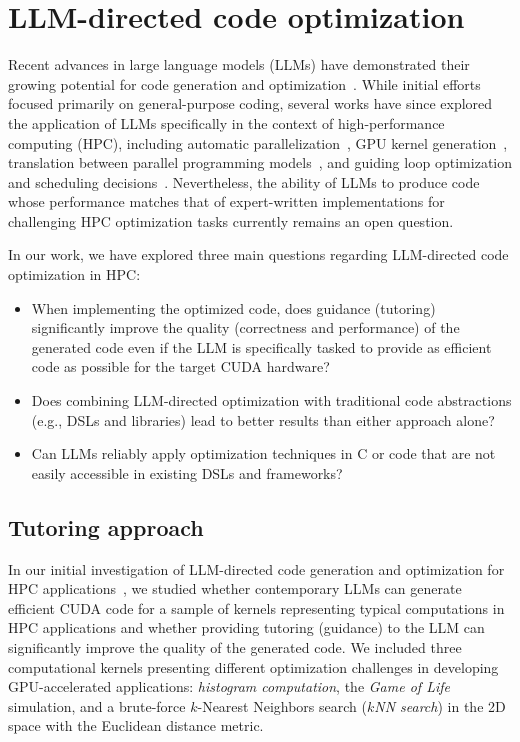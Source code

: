 \chapter{LLM-directed code optimization}\label{chap:llm-directed-code-optimization}

Recent advances in large language models (LLMs) have demonstrated their growing potential for code generation and optimization~\cite{chen2021evaluating}. While initial efforts focused primarily on general-purpose coding, several works have since explored the application of LLMs specifically in the context of high-performance computing (HPC), including automatic parallelization~\cite{mahmud2023autoparllm,nichols2024can}, GPU kernel generation~\cite{ouyang2025kernelbench,palkowski2024gpt}, translation between parallel programming models~\cite{dearing2024lassi}, and guiding loop optimization and scheduling decisions~\cite{merouani2025agentic}. Nevertheless, the ability of LLMs to produce code whose performance matches that of expert-written implementations for challenging HPC optimization tasks currently remains an open question.

In our work, we have explored three main questions regarding LLM-directed code optimization in HPC\@:

\begin{itemize}
  \item When implementing the optimized code, does guidance (tutoring) significantly improve the quality (correctness and performance) of the generated code even if the LLM is specifically tasked to provide as efficient code as possible for the target CUDA hardware?~\cite{brabec2025tutoring}
  \item Does combining LLM-directed optimization with traditional code abstractions (e.g., DSLs and libraries) lead to better results than either approach alone?~\cite{klepl2026shifting}
  \item Can LLMs reliably apply optimization techniques in C or \cpp code that are not easily accessible in existing DSLs and frameworks?~\cite{klepl2026shifting}
\end{itemize}


\section{Tutoring approach}\label{sec:tutoring-approach}

In our initial investigation of LLM-directed code generation and optimization for HPC applications~\cite{brabec2025tutoring}, we studied whether contemporary LLMs can generate efficient CUDA code for a sample of kernels representing typical computations in HPC applications and whether providing tutoring (guidance) to the LLM can significantly improve the quality of the generated code. We included three computational kernels presenting different optimization challenges in developing GPU-accelerated applications: \emph{histogram computation}, the \emph{Game of Life} simulation, and a brute-force $k$-Nearest Neighbors search (\emph{$k$NN search}) in the 2D space with the Euclidean distance metric.

